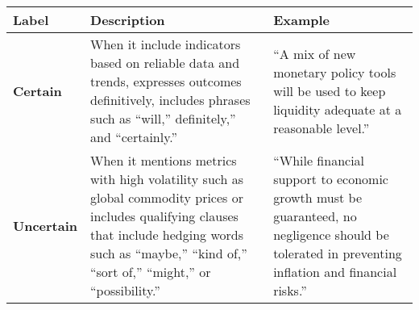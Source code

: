 \begin{table*}
    \caption{}
    \vspace{1em}
    \begin{tabular}{p{}p{}p{}}
    \toprule
    \textbf{Label} & \textbf{Description} & \textbf{Example}\\
    \midrule
    \textbf{Certain} & When it include indicators based on reliable data and trends, expresses outcomes definitively, includes phrases such as “will,” definitely,” and “certainly.” & ``A mix of new monetary policy tools will be used to keep liquidity adequate at a reasonable level.'' \\
    \midrule
    \textbf{Uncertain} & When it mentions metrics with high volatility such as global commodity prices or includes qualifying clauses that include hedging words such as ``maybe,'' ``kind of,'' ``sort of,'' ``might,'' or ``possibility.'' & ``While financial support to economic growth must be guaranteed, no negligence should be tolerated in preventing inflation and financial risks.'' \\
    \bottomrule
    \end{tabular}
    \label{tb:pboc_certainty_guide}
\end{table*}